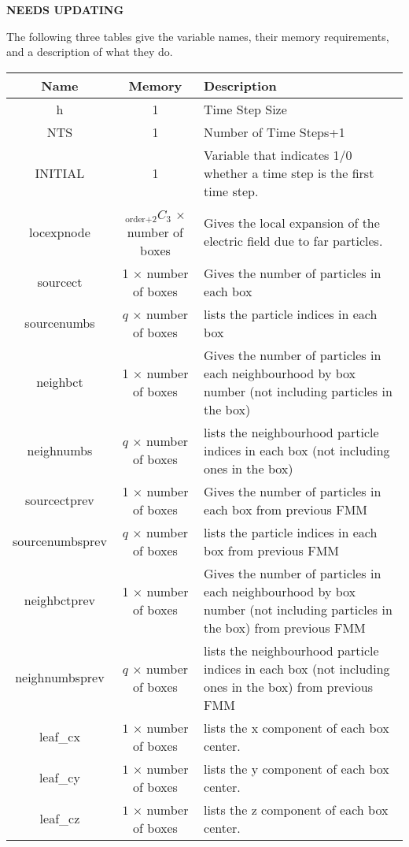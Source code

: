 \documentclass[oneside,12pt]{book}
\begin{document}
{\bf\color{red} NEEDS UPDATING}

The following three tables give the variable names, their memory requirements, and a description of what they do.
\begin{center}
\begin{table}[ht]
\begin{tabular}{|c|c|p{2.7in}|}
\hline
\textbf{Name} & \textbf{Memory} & \textbf{Description}\\
\hline
h & 1 & Time Step Size\\
\hline
NTS & 1 & Number of Time Steps+1\\
\hline
INITIAL & 1 & Variable that indicates 1/0 whether a time step is the first time step.\\
\hline
locexpnode & $_\text{order+2}C_3$ $\times$ number of boxes & Gives the local expansion of the electric field due to far particles. \\
\hline 
sourcect & 1 $\times$ number of boxes & Gives the number of particles in each box\\
\hline
sourcenumbs & $q$ $\times$ number of boxes & lists the particle indices in each box\\
\hline
neighbct & 1 $\times$ number of boxes & Gives the number of particles in each neighbourhood by box number (not including particles in the box)\\
\hline 
neighnumbs & $q$ $\times$ number of boxes & lists the neighbourhood particle indices in each box (not including ones in the box)\\
\hline
sourcectprev & 1 $\times$ number of boxes & Gives the number of particles in each box from previous FMM\\
\hline
sourcenumbsprev & $q$ $\times$ number of boxes & lists the particle indices in each box from previous FMM\\
\hline
neighbctprev & 1 $\times$ number of boxes & Gives the number of particles in each neighbourhood by box number (not including particles in the box) from previous FMM\\
\hline 
neighnumbsprev & $q$ $\times$ number of boxes & lists the neighbourhood particle indices in each box (not including ones in the box) from previous FMM\\
\hline
leaf\_cx & $1$ $\times$ number of boxes & lists the x component of each box center.\\
\hline
leaf\_cy & $1$ $\times$ number of boxes & lists the y component of each box center.\\
\hline
leaf\_cz & $1$ $\times$ number of boxes & lists the z component of each box center.\\

\end{tabular}
\end{table}
\end{center}
\end{document}
